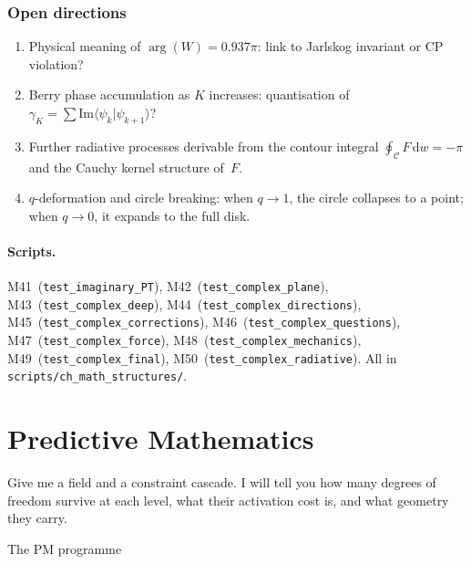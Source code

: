 \documentclass[12pt,a4paper]{article}
\begin{document}
\subsubsection{Open directions}
\label{subsec:cx_open}

\begin{enumerate}[nosep]
\item Physical meaning of $\arg(W) = 0.937\pi$: link to Jarlskog
  invariant or CP violation?
\item Berry phase accumulation as $K$ increases: quantisation of
  $\gamma_K = \sum \mathrm{Im}\langle\psi_k|\psi_{k+1}\rangle$?
\item Further radiative processes derivable from the contour integral
  $\oint_{\mathcal{C}} F\,\mathrm{d}w = -\pi$ and the Cauchy kernel
  structure of~$F$.
\item $q$-deformation and circle breaking: when $q \to 1$, the circle
  collapses to a point; when $q \to 0$, it expands to the full disk.
\end{enumerate}


\paragraph{Scripts.}
M41~(\texttt{test\_imaginary\_PT}),
M42~(\texttt{test\_complex\_plane}),
M43~(\texttt{test\_complex\_deep}),
M44~(\texttt{test\_complex\_directions}),
M45~(\texttt{test\_complex\_corrections}),
M46~(\texttt{test\_complex\_questions}),
M47~(\texttt{test\_complex\_force}),
M48~(\texttt{test\_complex\_mechanics}),
M49~(\texttt{test\_complex\_final}),
M50~(\texttt{test\_complex\_radiative}).
All in \texttt{scripts/ch\_math\_structures/}.


\newpage

\section{Predictive Mathematics}
\label{sec:PM}

\epigraph{Give me a field and a constraint cascade. I will tell you how many
degrees of freedom survive at each level, what their activation cost is,
and what geometry they carry.}{The PM programme}
\end{document}
